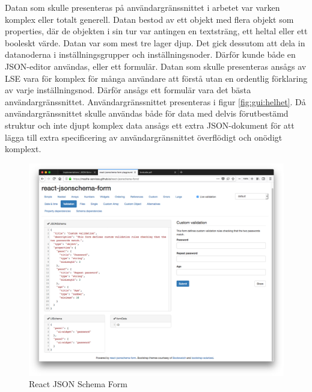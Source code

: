 Datan som skulle presenteras på användargränssnittet i arbetet var varken komplex eller totalt generell. Datan bestod av ett objekt med flera objekt som properties, där de objekten i sin tur var antingen en textsträng, ett heltal eller ett booleskt värde. Datan var som mest tre lager djup. Det gick dessutom att dela in datanoderna i inställningsgrupper och inställningsnoder. Därför kunde både en JSON-editor användas, eller ett formulär. Datan som skulle presenteras ansågs av LSE vara för komplex för många användare att förstå utan en ordentlig förklaring av varje inställningsnod. Därför ansågs ett formulär vara det bästa användargränssnittet. Användargränssnittet presenteras i figur \ref{fig:gui:helhet}. Då användargränssnittet skulle användas både för data med delvis förutbestämd struktur och inte djupt komplex data ansågs ett extra JSON-dokument för att lägga till extra specificering av användargränsnittet överflödigt och onödigt komplext.

\begin{figure}
	\includegraphics[width=\textwidth]{./images/screenshot-react-jsonschema-form.png}
	\caption{React JSON Schema Form \cite{MozillaServices}}
	\label{fig:react-jsonschema-form}
\end{figure}


